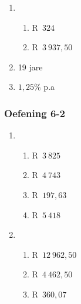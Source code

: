 {\begin{multicols}{3}
\begin{enumerate}[noitemsep, label=\textbf{\arabic*}.]
	\item %
	\begin{enumerate}[noitemsep, label=\textbf{(\alph*)} ]
	    \item R~$324$%

	    \item R~$3~937,50$ %
	\end{enumerate}

	\item 19 jare %

	\item $1,25\%$ p.a%
    \end{enumerate}


\subsubsection*{Oefening 6-2} %

    \begin{enumerate}[label=\textbf{\arabic*}.]
	\item %
	\begin{enumerate}[noitemsep, label=\textbf{(\alph*)} ]
	    \item R~$3~825$%
	    \item R~$4~743$%
	    \item R~$197,63$%
	    \item R~$5~418$%
	\end{enumerate}


	\item %
	\begin{enumerate}[noitemsep, label=\textbf{(\alph*)} ]
	    \item R~$12~962,50$%
	    \item R~$4~462,50$ %
	    \item R~$360,07$%
	\end{enumerate}


\end{enumerate}
\end{multicols}}
